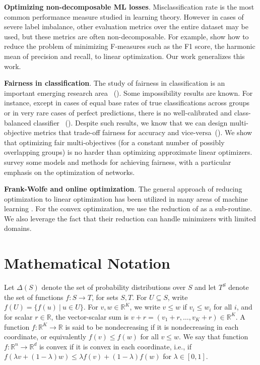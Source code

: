 \documentclass[final, 12pt]{colt2018} %
\def\reals{{\mathbb R}}
\begin{document}
\medskip
\noindent
\textbf{Optimizing non-decomposable ML losses}.
Misclassification rate is the most common performance measure studied in
learning theory.  However in cases of severe label imbalance, other evaluation metrics over the entire dataset may be used, but these metrics are often non-decomposable. For example, \cite{ParambathUG14} show how to reduce the problem of minimizing F-measures such as the F1 score, the harmonic mean of precision and recall, to linear optimization. Our work generalizes this work.

\medskip
\noindent
\textbf{Fairness in classification}.
The study of fairness in classification is an important emerging research area
~(\cite{Dwork:2012, JosephKMR16, Kearns:17}). Some impossibility results are
known. For instance, except in cases of equal base rates of true
classifications across groups or in very rare cases of perfect predictions,
there is no well-calibrated and class-balanced classifier
~(\cite{KleinbergMR17,Chouldechova17}). Despite such results,
we know that we can design multi-objective metrics that trade-off fairness for accuracy and
vice-versa~(\cite{Woodworth:2017, MenonW17, dwork18a, Goh16}). We show that optimizing fair multi-objectives
(for a constant number of possibly overlapping groups) is no harder than
optimizing approximate linear optimizers.
\cite{OgryczakLPNT14}
survey some models and methods for achieving
fairness, with a particular emphasis on the optimization
of networks. 

\medskip
\noindent
\textbf{Frank-Wolfe and online optimization}.
The general approach of reducing optimization to linear optimization has been utilized in many areas of machine learning \citep{revisitingFrankWolfe,KalaiMV08}. For the convex optimization, we use the reduction of \cite{KakadeKL09} as a sub-routine. We also leverage the fact that their reduction can handle minimizers with limited domains.

\section{Mathematical Notation}
Let $\Delta(S)$ denote the set of probability distributions over $S$ and let $T^S$ denote the set of functions $f: S \rightarrow T$, for sets $S,T$. For $U \subseteq S$, write $f(U) = \{f(u)~|~u \in U\}$. For $v, w\in \reals^K$, we write $v\leq w$ if $v_i\leq w_i$ for all $i$, and for scalar $r \in \reals$, the vector-scalar sum is $v+r=(v_1+r, \ldots, v_K+r)\in \reals^K$. A function $f: \reals^K \rightarrow \reals$ is said to be nondecreasing if it is nondecreasing in each coordinate, or equivalently $f(v) \leq f(w)$ for all $v\leq w$. We say that function $f:\reals^n \rightarrow \reals^d$ is convex if it is convex in each coordinate, i.e., if $f(\lambda v + (1-\lambda)w) \leq \lambda f(v) + (1-\lambda) f(w)$ for $\lambda \in [0,1]$.
\end{document}
